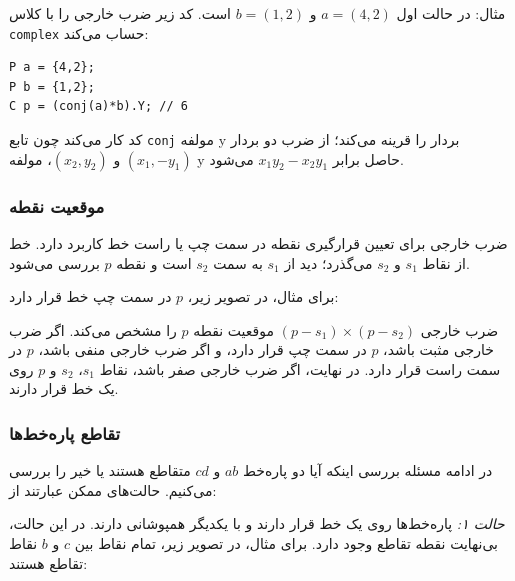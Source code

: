 \noindent
مثال: در حالت اول $a=(4,2)$ و $b=(1,2)$ است.
کد زیر ضرب خارجی را با کلاس \texttt{complex} حساب می‌کند:

\begin{lstlisting}
P a = {4,2};
P b = {1,2};
C p = (conj(a)*b).Y; // 6
\end{lstlisting}

کد کار می‌کند چون تابع \texttt{conj} مولفه y بردار را قرینه می‌کند؛
از ضرب دو بردار $(x_1,-y_1)$ و $(x_2,y_2)$، مولفه y حاصل برابر $x_1 y_2 - x_2 y_1$ می‌شود.

\subsubsection{موقعیت نقطه}

ضرب خارجی برای تعیین قرارگیری نقطه در سمت چپ یا راست خط کاربرد دارد.
خط از نقاط $s_1$ و $s_2$ می‌گذرد؛ دید از $s_1$ به سمت $s_2$ است و نقطه $p$ بررسی می‌شود.

برای مثال، در تصویر زیر،
$p$ در سمت چپ خط قرار دارد:
\begin{center}
\end{center}

ضرب خارجی $(p-s_1) \times (p-s_2)$
موقعیت نقطه $p$ را مشخص می‌کند.
اگر ضرب خارجی مثبت باشد،
$p$ در سمت چپ قرار دارد،
و اگر ضرب خارجی منفی باشد،
$p$ در سمت راست قرار دارد.
در نهایت، اگر ضرب خارجی صفر باشد،
نقاط $s_1$، $s_2$ و $p$ روی یک خط قرار دارند.

\subsubsection{تقاطع پاره‌خط‌ها}


در ادامه مسئله بررسی اینکه آیا دو پاره‌خط
$ab$ و $cd$ متقاطع هستند یا خیر را بررسی می‌کنیم. حالت‌های ممکن عبارتند از:

\textit{حالت ۱:}
پاره‌خط‌ها روی یک خط قرار دارند
و با یکدیگر همپوشانی دارند.
در این حالت، بی‌نهایت نقطه تقاطع وجود دارد.
برای مثال، در تصویر زیر،
تمام نقاط بین $c$ و $b$ نقاط تقاطع هستند:
\begin{center}
\end{center}

